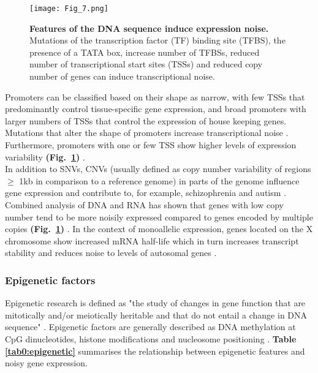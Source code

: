 \newpage

\begin{figure}[!h]
\centering
\texttt{[image: Fig\_7.png]}
\caption[Features of the DNA sequence induce expression noise]{\textbf{Features of the DNA sequence induce expression noise.}\\
Mutations of the transcription factor (TF) binding site (TFBS), the presence of a TATA box, increase number of TFBSs, reduced number of transcriptional start sites (TSSs) and reduced copy number of genes can induce transcriptional noise.}
\label{fig0:DNA_features}
\end{figure}

Promoters can be classified based on their shape as narrow, with few \glspl{TSS} that predominantly control tissue-specific gene expression, and broad promoters with larger numbers of TSSs that control the expression of house keeping genes. Mutations that alter the shape of promoters increase transcriptional noise \citep{Schor2017a}. Furthermore, promoters with one or few TSS show higher levels of expression variability \textbf{(Fig.~\ref{fig0:DNA_features})} \citep{Faure2017}.\\

In addition to SNVs, \glspl{CNV} (usually defined as copy number variability of regions $\geq$ 1kb in comparison to a reference genome) in parts of the genome influence gene expression and contribute to, for example, schizophrenia and autism \citep{Gamazon2015}. Combined analysis of DNA and RNA has shown that genes with low copy number tend to be more noisily expressed compared to genes encoded by multiple copies \textbf{(Fig.~\ref{fig0:DNA_features})} \citep{Dey2015}. In the context of monoallelic expression, genes located on the X chromosome show increased mRNA half-life which in turn increases transcript stability and reduces noise to levels of autosomal genes \citep{Faure2017}.

\subsubsection{Epigenetic factors}
\label{sec0:epigenetic}

Epigenetic research is defined as "the study of changes in gene function that are mitotically and/or meiotically heritable and that do not entail a change in DNA sequence" \citep{Wu2001}. Epigenetic factors are generally described as DNA methylation at \gls{CpG} dinucleotides, histone modifications and nucleosome positioning  \citep{Portela2010}. \textbf{Table \ref{tab0:epigenetic}} summarises the relationship between epigenetic features and noisy gene expression. \\

